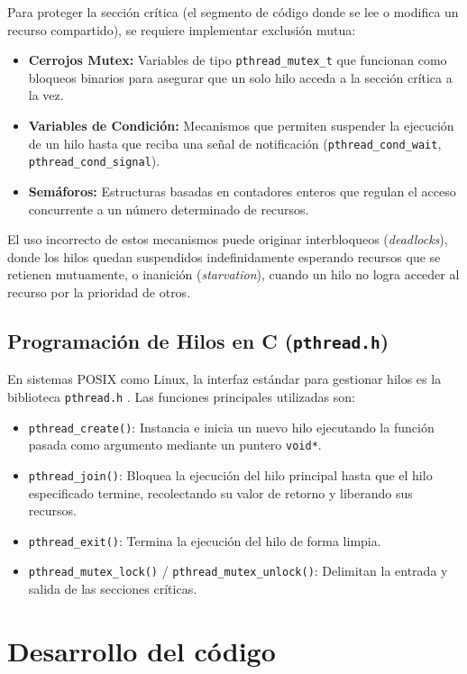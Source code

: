 Para proteger la sección crítica (el segmento de código donde se lee o modifica un recurso compartido), se requiere implementar exclusión mutua:
\begin{itemize}
    \item \textbf{Cerrojos Mutex:} Variables de tipo \texttt{pthread\_mutex\_t} que funcionan como bloqueos binarios para asegurar que un solo hilo acceda a la sección crítica a la vez.
    \item \textbf{Variables de Condición:} Mecanismos que permiten suspender la ejecución de un hilo hasta que reciba una señal de notificación (\texttt{pthread\_cond\_wait}, \texttt{pthread\_cond\_signal}).
    \item \textbf{Semáforos:} Estructuras basadas en contadores enteros que regulan el acceso concurrente a un número determinado de recursos.
\end{itemize}

El uso incorrecto de estos mecanismos puede originar interbloqueos (\textit{deadlocks}), donde los hilos quedan suspendidos indefinidamente esperando recursos que se retienen mutuamente, o inanición (\textit{starvation}), cuando un hilo no logra acceder al recurso por la prioridad de otros.

\subsection{Programación de Hilos en C (\texttt{pthread.h})}
En sistemas POSIX como Linux, la interfaz estándar para gestionar hilos es la biblioteca \texttt{pthread.h} \cite{stevens:advanced-unix-programming:2013}. Las funciones principales utilizadas son:
\begin{itemize}
    \item \texttt{pthread\_create()}: Instancia e inicia un nuevo hilo ejecutando la función pasada como argumento mediante un puntero \texttt{void*}.
    \item \texttt{pthread\_join()}: Bloquea la ejecución del hilo principal hasta que el hilo especificado termine, recolectando su valor de retorno y liberando sus recursos.
    \item \texttt{pthread\_exit()}: Termina la ejecución del hilo de forma limpia.
    \item \texttt{pthread\_mutex\_lock()} / \texttt{pthread\_mutex\_unlock()}: Delimitan la entrada y salida de las secciones críticas.
\end{itemize}

\section{Desarrollo del código}
\label{sec:prac03:desarrollo}

